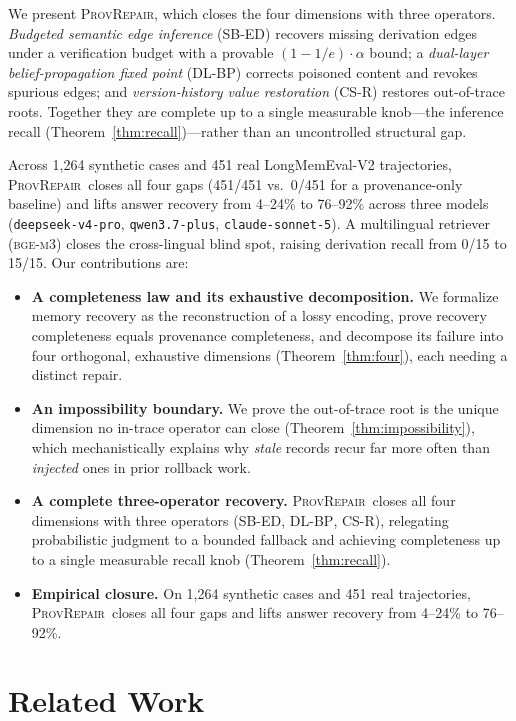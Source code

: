 \documentclass[11pt]{article}
\theoremstyle{remark}
\newcommand{\ours}{\textsc{ProvRepair}}
\newcommand{\anchor}{provenance-only baseline}
\newcommand{\sbed}{\textsc{SB-ED}}
\newcommand{\dlbp}{\textsc{DL-BP}}
\newcommand{\csr}{\textsc{CS-R}}
\begin{document}
We present \ours, which closes the four dimensions with three operators.
\emph{Budgeted semantic edge inference} (\sbed) recovers missing derivation edges
under a verification budget with a provable $(1{-}1/e)\cdot\alpha$ bound; a
\emph{dual-layer belief-propagation fixed point} (\dlbp) corrects poisoned content and
revokes spurious edges; and \emph{version-history value restoration} (\csr) restores
out-of-trace roots. Together they are complete up to a single measurable knob---the
inference recall (Theorem~\ref{thm:recall})---rather than an uncontrolled structural
gap.

Across 1{,}264 synthetic cases and 451 real LongMemEval-V2 trajectories, \ours\ closes
all four gaps (451/451 vs.\ 0/451 for a \anchor) and lifts answer recovery from
4--24\% to 76--92\% across three models (\texttt{deepseek-v4-pro},
\texttt{qwen3.7-plus}, \texttt{claude-sonnet-5}). A multilingual retriever
(\textsc{bge-m3}) closes the cross-lingual blind spot, raising derivation recall from
0/15 to 15/15. Our contributions are:

\begin{itemize}
\itemsep0pt
\item \textbf{A completeness law and its exhaustive decomposition.} We formalize
memory recovery as the reconstruction of a lossy encoding, prove recovery
completeness equals provenance completeness, and decompose its failure into four
orthogonal, exhaustive dimensions (Theorem~\ref{thm:four}), each needing a distinct
repair.
\item \textbf{An impossibility boundary.} We prove the out-of-trace root is the unique
dimension no in-trace operator can close (Theorem~\ref{thm:impossibility}), which
mechanistically explains why \emph{stale} records recur far more often than
\emph{injected} ones in prior rollback work.
\item \textbf{A complete three-operator recovery.} \ours\ closes all four dimensions
with three operators (\sbed, \dlbp, \csr), relegating probabilistic judgment to a
bounded fallback and achieving completeness up to a single measurable recall knob
(Theorem~\ref{thm:recall}).
\item \textbf{Empirical closure.} On 1{,}264 synthetic cases and 451 real trajectories,
\ours\ closes all four gaps and lifts answer recovery from 4--24\% to 76--92\%.
\end{itemize}

\section{Related Work}
\label{sec:related}
\end{document}
